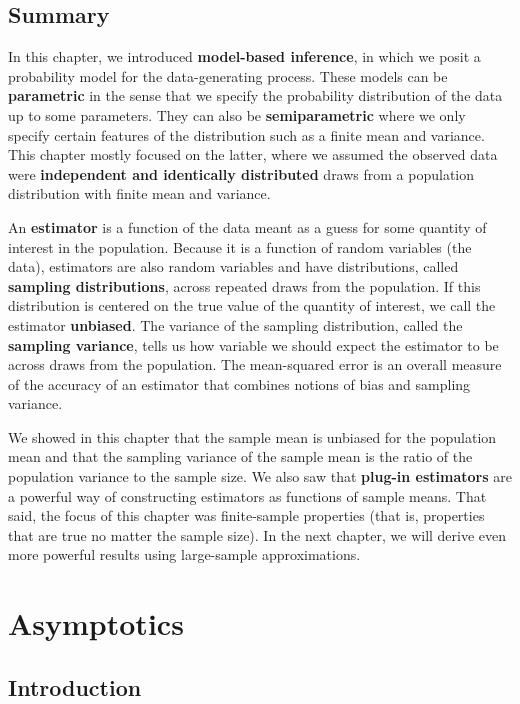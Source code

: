 \documentclass[
  13pt,
  letterpaper,
  DIV=11,
  numbers=noendperiod]{scrreprt}
\theoremstyle{plain}
\theoremstyle{definition}
\theoremstyle{definition}
\theoremstyle{remark}
\begin{document}
\section{Summary}\label{summary-1}

In this chapter, we introduced \textbf{model-based inference}, in which
we posit a probability model for the data-generating process. These
models can be \textbf{parametric} in the sense that we specify the
probability distribution of the data up to some parameters. They can
also be \textbf{semiparametric} where we only specify certain features
of the distribution such as a finite mean and variance. This chapter
mostly focused on the latter, where we assumed the observed data were
\textbf{independent and identically distributed} draws from a population
distribution with finite mean and variance.

An \textbf{estimator} is a function of the data meant as a guess for
some quantity of interest in the population. Because it is a function of
random variables (the data), estimators are also random variables and
have distributions, called \textbf{sampling distributions}, across
repeated draws from the population. If this distribution is centered on
the true value of the quantity of interest, we call the estimator
\textbf{unbiased}. The variance of the sampling distribution, called the
\textbf{sampling variance}, tells us how variable we should expect the
estimator to be across draws from the population. The mean-squared error
is an overall measure of the accuracy of an estimator that combines
notions of bias and sampling variance.

We showed in this chapter that the sample mean is unbiased for the
population mean and that the sampling variance of the sample mean is the
ratio of the population variance to the sample size. We also saw that
\textbf{plug-in estimators} are a powerful way of constructing
estimators as functions of sample means. That said, the focus of this
chapter was finite-sample properties (that is, properties that are true
no matter the sample size). In the next chapter, we will derive even
more powerful results using large-sample approximations.

\chapter{Asymptotics}\label{sec-asymptotics}

\section{Introduction}\label{introduction-2}
\end{document}
